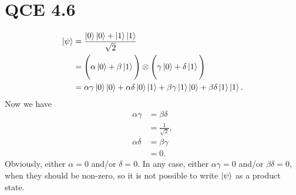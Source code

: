 \documentclass[10pt]{article}
\begin{document}
\section*{QCE 4.6}
\begin{align*}
\ket{\psi} &= \frac{\ket{0} \ket{0} + \ket{1} \ket{1}}{\sqrt{2}} \\
				&= \Bigg( \alpha \ket{0} + \beta \ket{1} \Bigg) \otimes \Bigg( \gamma \ket{0} + \delta \ket{1} \Bigg) \\
				&= \alpha \gamma \ket{0} \ket{0} + \alpha \delta \ket{0} \ket{1} + \beta \gamma \ket{1} \ket{0} + \beta \delta \ket{1} \ket{1}.
\end{align*}
Now we have
\begin{align*}
\alpha \gamma &= \beta \delta \\
						 &= \frac{1}{\sqrt{2}}, \\
\alpha \delta &= \beta \gamma \\
					  &= 0.
\end{align*}
Obviously, either $\alpha = 0$ and/or $\delta = 0$. In any case, either $\alpha\gamma = 0$ and/or $\beta \delta = 0$, when they should be non-zero, so it is not possible to write $\ket{\psi}$ as a product state.
\end{document}
